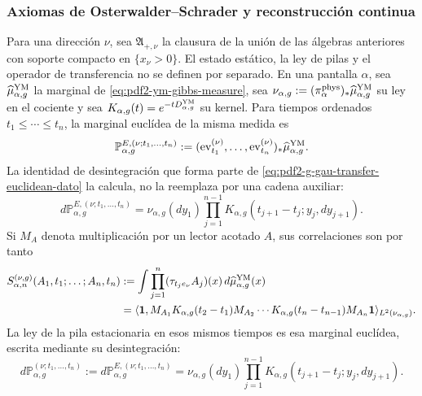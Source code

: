 \subsubsection{Axiomas de Osterwalder--Schrader y reconstrucción continua}

Para una dirección $\nu$, sea $\mathfrak A_{+,\nu}$ la clausura de la unión de
las álgebras anteriores con soporte compacto en $\{x_\nu>0\}$. El estado
estático, la ley de pilas y el operador de transferencia no se definen por
separado. En una pantalla $\alpha$, sea
$\widehat\mu_{\alpha,g}^{\rm YM}$ la marginal de
\eqref{eq:pdf2-ym-gibbs-measure}, sea
$\nu_{\alpha,g}:=(\pi_\alpha^{\rm phys})_*
\widehat\mu_{\alpha,g}^{\rm YM}$ su ley en el cociente y sea
$K_{\alpha,g}(t)=e^{-tD_{\alpha,g}^{\rm YM}}$ su kernel.
Para tiempos ordenados $t_1\le\cdots\le t_n$, la marginal euclídea de la
misma medida es
\begin{equation}\label{eq:pdf2-ym-owner-euclidean-time-marginal}
 \mathbb P_{\alpha,g}^{E,(\nu;t_1,\ldots,t_n)}
 :=(\operatorname{ev}_{t_1}^{(\nu)},\ldots,
    \operatorname{ev}_{t_n}^{(\nu)})_*
    \widehat\mu_{\alpha,g}^{\rm YM}.
\end{equation}
La identidad de desintegración que forma parte de
\eqref{eq:pdf2-g-gau-transfer-euclidean-dato} la calcula, no la reemplaza por
una cadena auxiliar:
\begin{equation}\label{eq:pdf2-ym-owner-euclidean-markov-identification}
 d\mathbb P_{\alpha,g}^{E,(\nu;t_1,\ldots,t_n)}
 =\nu_{\alpha,g}(dy_1)
   \prod_{j=1}^{n-1}K_{\alpha,g}
      (t_{j+1}-t_j;y_j,dy_{j+1}).
\end{equation}
Si $M_A$ denota multiplicación por un lector acotado $A$, sus correlaciones
son por tanto
\begin{equation}\label{eq:pdf2-ym-owner-schwinger-transfer}
 \begin{aligned}
 S_{\alpha,n}^{(\nu,g)}(A_1,t_1;\ldots;A_n,t_n)
 &:=\int\prod_{j=1}^n(\tau_{t_je_\nu}A_j)(x)\,
       d\widehat\mu_{\alpha,g}^{\rm YM}(x)\\
 &=\langle\mathbf1,
 M_{A_1}K_{\alpha,g}(t_2-t_1)M_{A_2}\cdots
 K_{\alpha,g}(t_n-t_{n-1})M_{A_n}\mathbf1
 \rangle_{L^2(\nu_{\alpha,g})}.
 \end{aligned}
\end{equation}
La ley de la pila estacionaria en esos mismos tiempos es esa marginal
euclídea, escrita mediante su desintegración:
\begin{equation}\label{eq:pdf2-ym-owner-markov-stack-law}
 d\mathbb P_{\alpha,g}^{(\nu;t_1,\ldots,t_n)}
 :=d\mathbb P_{\alpha,g}^{E,(\nu;t_1,\ldots,t_n)}
 =\nu_{\alpha,g}(dy_1)
   \prod_{j=1}^{n-1}K_{\alpha,g}(t_{j+1}-t_j;y_j,dy_{j+1}).
\end{equation}
